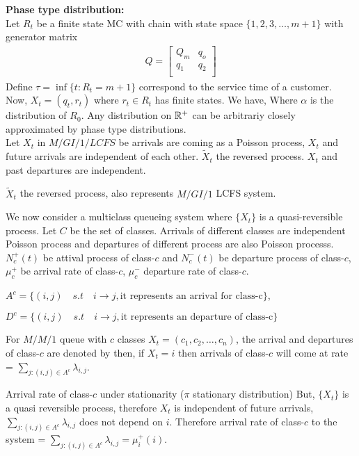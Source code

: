 \documentclass[all-lectures.tex]{subfiles}
\begin{document}
\textbf{Phase type distribution:}\\
Let $R_t$ be a finite state MC with chain with state space $\{1,2,3, \dots, m+1\}$ with generator matrix
\begin{align*}
	Q = 
\begin{bmatrix}
	Q_m      & q_o \\
	q_1      & q_2 \\	
\end{bmatrix}
\end{align*}
Define $\tau = \inf\{t: R_t = m+1\}$ correspond to the service time of a customer. Now, $X_t = (q_t,r_t)$ where $r_t \in R_t$ has finite states. We have,
Where $\alpha$ is the distribution of $R_0$. Any distribution on $\mathbb{R}^+$ can be arbitrariy closely approximated by phase type distributions. \\
\indent Let $X_t$ in $M/GI/1/LCFS$  be arrivals are coming as a Poisson process, $X_t$ and future arrivals are independent of each other.
$\tilde{X}_t$ the reversed process. $X_t$ and past departures are independent.
\begin{prop}
$\tilde{X}_t$ the reversed process, also represents $M/GI/1$ LCFS system.
\end{prop}

We now consider a multiclass queueing system where $\{X_t\}$ is a quasi-reversible process. Let $C$ be the set of classes. Arrivals of different classes are independent Poisson process and departures of different process are also Poisson processs. $N_c^+ (t)$  be attival process of class-$c$ and $N_c^-(t)$ be departure process of class-$c$, $\mu_c^+$ be arrival rate of class-$c$, $\mu_c^-$ departure rate of class-$c$.

$A^c = \{(i,j) \quad s.t \quad i \to j, \text{it represents an arrival for class-c}\}$,

$D^c = \{(i,j) \quad s.t \quad i \to j, \text{it represents an departure of class-c}\}$

For $M/M/1$ queue with $c$ classes
$X_t = (c_1, c_2, \dots, c_n)$,
the arrival and departures of class-$c$ are denoted by
then, if $X_t = i$ then arrivals of class-$c$ will come at rate = $\sum_{j:(i,j) \in A^c} \lambda_{i,j}$.

Arrival rate of class-$c$ under stationarity ($\pi$ stationary distribution)
But, $\{X_t\}$ is a quasi reversible process, therefore $X_t$ is independent of future arrivals, $\sum_{j:(i,j) \in A^c} \lambda_{i,j}$ does not depend on $i$.
Therefore arrival rate of class-$c$ to the system = $\sum_{j:(i,j) \in A^c} \lambda_{i,j} = \mu_i^+(i)$.
\end{document}
